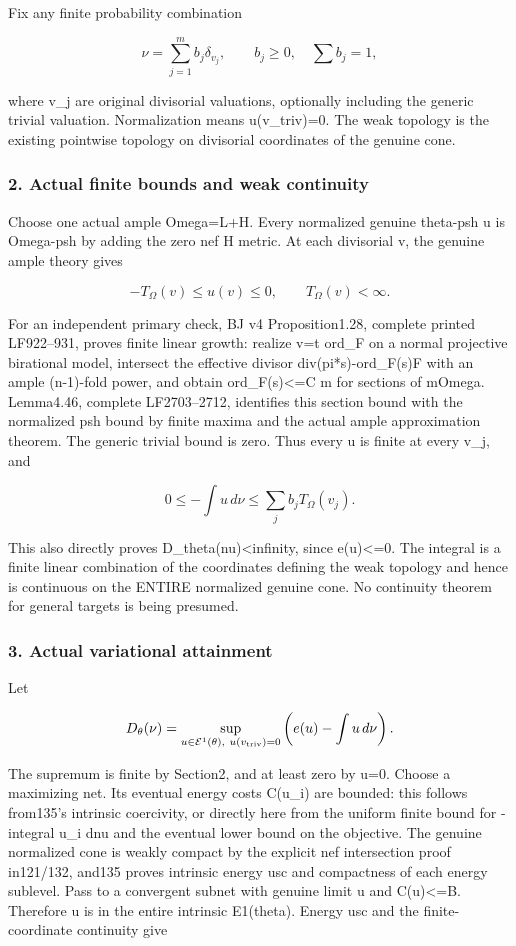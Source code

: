\documentclass[
]{article}
\begin{document}
Fix any finite probability combination

\[\nu=\sum_{j=1}^m b_j\delta_{v_j},\qquad b_j\geq0,\quad\sum b_j=1,\]

where v\_j are original divisorial valuations, optionally including the
generic trivial valuation. Normalization means u(v\_triv)=0. The weak
topology is the existing pointwise topology on divisorial coordinates of
the genuine cone.

\subsubsection{2. Actual finite bounds and weak
continuity}\label{actual-finite-bounds-and-weak-continuity}

Choose one actual ample Omega=L+H. Every normalized genuine theta-psh u
is Omega-psh by adding the zero nef H metric. At each divisorial v, the
genuine ample theory gives

\[-T_\Omega(v)\leq u(v)\leq0,\qquad T_\Omega(v)<\infty.\]

For an independent primary check, BJ v4 Proposition1.28, complete
printed LF922--931, proves finite linear growth: realize v=t ord\_F on a
normal projective birational model, intersect the effective divisor
div(pi*s)-ord\_F(s)F with an ample (n-1)-fold power, and obtain
ord\_F(s)\textless=C m for sections of mOmega. Lemma4.46, complete
LF2703--2712, identifies this section bound with the normalized psh
bound by finite maxima and the actual ample approximation theorem. The
generic trivial bound is zero. Thus every u is finite at every v\_j, and

\[0\leq-\int u\,d\nu\leq\sum_j b_j T_\Omega(v_j).\]

This also directly proves D\_theta(nu)\textless infinity, since
e(u)\textless=0. The integral is a finite linear combination of the
coordinates defining the weak topology and hence is continuous on the
ENTIRE normalized genuine cone. No continuity theorem for general
targets is being presumed.

\subsubsection{3. Actual variational
attainment}\label{actual-variational-attainment}

Let

\[D_\theta(\nu)=\sup_{u\in\mathcal E^1(\theta),\ u(v_{\rm triv})=0}
\left(e(u)-\int u\,d\nu\right).\]

The supremum is finite by Section2, and at least zero by u=0. Choose a
maximizing net. Its eventual energy costs C(u\_i) are bounded: this
follows from135's intrinsic coercivity, or directly here from the
uniform finite bound for -integral u\_i dnu and the eventual lower bound
on the objective. The genuine normalized cone is weakly compact by the
explicit nef intersection proof in121/132, and135 proves intrinsic
energy usc and compactness of each energy sublevel. Pass to a convergent
subnet with genuine limit u and C(u)\textless=B. Therefore u is in the
entire intrinsic E1(theta). Energy usc and the finite-coordinate
continuity give
\end{document}
